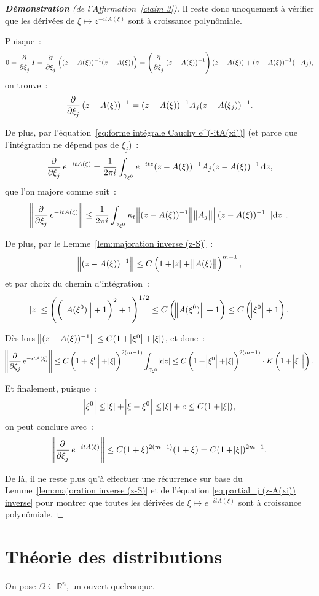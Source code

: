 \documentclass{report}
\newcommand{\R}{{\mathbb R}}
\theoremstyle{definition}
\theoremstyle{remark}
\begin{document}
\begin{proof}[\textnormal {\textbf {Démonstration} (de l'Affirmation~\ref{claim 3})}] Il reste donc unoquement à vérifier que les dérivées de $\xi \mapsto z^{-itA(\xi)}$ sont à
croissance polynômiale.

Puisque~:
\[0 = \dpd {}{\xi_j}I = \dpd {}{\xi_j}\left((z-A(\xi))^{-1}(z-A(\xi))\right) = \left(\dpd {}{\xi_j}(z-A(\xi))^{-1}\right)(z-A(\xi)) + (z-A(\xi))^{-1}(-A_j),\]
on trouve~:
\begin{equation}\label{eq:partial_j (z-A(xi)) inverse}
	\dpd {}{\xi_j}(z-A(\xi))^{-1} = (z-A(\xi))^{-1}A_j(z-A(\xi_j))^{-1}.
\end{equation}

De plus, par l'équation~\eqref{eq:forme intégrale Cauchy e^(-itA(xi))} (et parce que l'intégration ne dépend pas de $\xi_j$)~:
\[\dpd {}{\xi_j}e^{-itA(\xi)} = \frac 1{2\pi i}\int_{\gamma_{\xi^0}}e^{-itz}(z-A(\xi))^{-1}A_j(z-A(\xi))^{-1}\dif z,\]
que l'on majore comme suit~:
\[\norm {\dpd {}{\xi_j}e^{-itA(\xi)}} \leq \frac 1{2\pi i}\int_{\gamma_{\xi^0}}\kappa_t\norm {(z-A(\xi))^{-1}}\norm {A_j}\norm {(z-A(\xi))^{-1}}\abs {\dif z}.\]

De plus, par le Lemme~\ref{lem:majoration inverse (z-S)}~:
\[\norm {(z-A(\xi))^{-1}} \leq C\left(1+\abs z + \norm {A(\xi)}\right)^{m-1},\]
et par choix du chemin d'intégration~:
\[\abs z \leq \left(\left(\norm {A(\xi^0)} + 1\right)^2 + 1\right)^{1/2} \leq C\left(\norm {A(\xi^0)}+1\right) \leq C\left(\abs {\xi^0}+1\right).\]

Dès lors $\norm {(z-A(\xi))^{-1}} \leq C(1+\abs {\xi^0}+\abs {\xi})$, et donc~:
\[\norm {\dpd {}{\xi_j}e^{-itA(\xi)}} \leq C\left(1+\abs {\xi^0}+\abs \xi\right)^{2(m-1)}\int_{\gamma_{\xi^0}}\abs {\dif z}
	\leq C\left(1 + \abs {\xi^0} + \abs \xi\right)^{2(m-1)} \cdot K \left(1+\abs {\xi^0}\right).\]

Et finalement, puisque~:
\[\abs {\xi^0} \leq \abs \xi + \abs {\xi-\xi^0} \leq \abs \xi + c \leq C(1+\abs \xi),\]
on peut conclure avec~:
\[\norm {\dpd {}{\xi_j}e^{-itA(\xi)}} \leq C(1+\xi)^{2(m-1)}(1+\xi) = C(1+\abs \xi)^{2m-1}.\]

De là, il ne reste plus qu'à effectuer une récurrence sur base du Lemme~\ref{lem:majoration inverse (z-S)} et de l'équation \eqref{eq:partial_j (z-A(xi)) inverse} pour montrer
que toutes les dérivées de $\xi \mapsto e^{-itA(\xi)}$ sont à croissance polynômiale.
\end{proof}

\chapter{Théorie des distributions}
On pose $\Omega \subseteq \R^n$, un ouvert quelconque.
\end{document}
